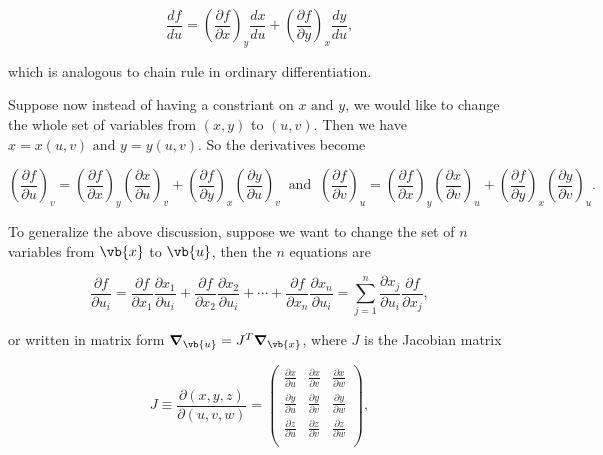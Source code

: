 \documentclass[english,a4paper,12pt]{report}
\begin{document}
\begin{equation}
    \frac{df}{du} = \left( \frac{\partial f}{\partial x}  \right)_{y} \frac{dx}{du} + \left( \frac{\partial f}{\partial y}  \right)_{x} \frac{dy}{du},  
\end{equation}

which is analogous to chain rule in ordinary differentiation.

Suppose now instead of having a constriant on \(x\text { and } y\), we would like to change the whole set of variables from \((x,y)\) to \((u,v)\). Then we have \(x = x(u,v) \text { and } y = y(u,v)\). So the derivatives become

\begin{equation} \label{changeofvar} 
    \left( \frac{\partial f}{\partial u}  \right)_{v} = \left( \frac{\partial f}{\partial x}  \right)_{y} \left( \frac{\partial x}{\partial u}  \right)_{v}  + \left( \frac{\partial f}{\partial y}  \right)_{x} \left( \frac{\partial y}{\partial u}  \right)_{v} ~\text { and }~ \left( \frac{\partial f}{\partial v}  \right)_{u} = \left( \frac{\partial f}{\partial x}  \right)_{y}\left( \frac{\partial x}{\partial v}  \right)_{u} + \left( \frac{\partial f}{\partial y}  \right)_{x} \left( \frac{\partial y}{\partial v}  \right)_{u}.      
\end{equation}

To generalize the above discussion, suppose we want to change the set of \(n\) variables from \(\vb{x}\) to \(\vb{u} \), then the \(n\) equations are 

\begin{equation}
	\frac{\partial f}{\partial u_{i} } = \frac{\partial f}{\partial x_1 }\frac{\partial x_1}{\partial u_{i} } + \frac{\partial f}{\partial x_2 }\frac{\partial x_2 }{\partial u_{i} } + \cdots + \frac{\partial f}{\partial x_{n} }\frac{\partial x_{n} }{\partial u_{i} } = \sum_{j=1}^{n} \frac{\partial x_{j} }{\partial u_{i} }\frac{\partial f}{\partial x_{j} },
\end{equation}

or written in matrix form \(\boldsymbol{\nabla }_{\vb{u} } = J^T \boldsymbol{\nabla }_{\vb{x} }\), where \(J\) is the Jacobian matrix 

\begin{equation}
	J \equiv \frac{\partial (x,y,z)}{\partial (u,v,w)} = \begin{pmatrix}
		\frac{\partial x}{\partial u}  & \frac{\partial x}{\partial v}  & \frac{\partial x}{\partial w}   \\
		\frac{\partial y}{\partial u}  & \frac{\partial y}{\partial v}  & \frac{\partial y}{\partial w}   \\
		\frac{\partial z}{\partial u}  & \frac{\partial z}{\partial v}  & \frac{\partial z}{\partial w}   \\
	\end{pmatrix},
\end{equation}
\end{document}
